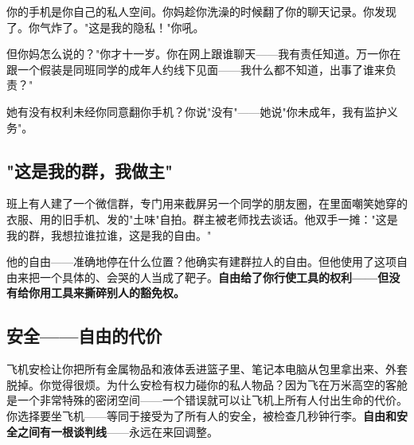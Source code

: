 \documentclass[a4paper,12pt]{ctexart}
\begin{document}
你的手机是你自己的私人空间。你妈趁你洗澡的时候翻了你的聊天记录。你发现了。你气炸了。"这是我的隐私！"你吼。

但你妈怎么说的？"你才十一岁。你在网上跟谁聊天——我有责任知道。万一你在跟一个假装是同班同学的成年人约线下见面——我什么都不知道，出事了谁来负责？"

她有没有权利未经你同意翻你手机？你说"没有"——她说"你未成年，我有监护义务"。

\subsection*{"这是我的群，我做主"}

班上有人建了一个微信群，专门用来截屏另一个同学的朋友圈，在里面嘲笑她穿的衣服、用的旧手机、发的"土味"自拍。群主被老师找去谈话。他双手一摊："这是我的群，我想拉谁拉谁，这是我的自由。"

他的自由——准确地停在什么位置？他确实有建群拉人的自由。但他使用了这项自由来把一个具体的、会哭的人当成了靶子。\textbf{自由给了你行使工具的权利——但没有给你用工具来撕碎别人的豁免权。}


\subsection*{安全——自由的代价}

飞机安检让你把所有金属物品和液体丢进篮子里、笔记本电脑从包里拿出来、外套脱掉。你觉得很烦。为什么安检有权力碰你的私人物品？因为飞在万米高空的客舱是一个非常特殊的密闭空间——一个错误就可以让飞机上所有人付出生命的代价。你选择要坐飞机——等同于接受为了所有人的安全，被检查几秒钟行李。\textbf{自由和安全之间有一根谈判线}——永远在来回调整。
\end{document}
